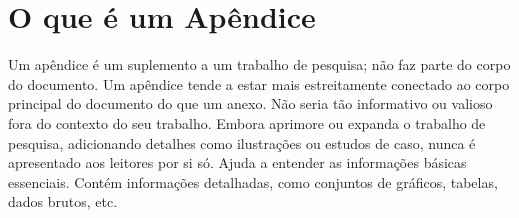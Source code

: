 \chapter{O que é um Apêndice}
Um apêndice é um suplemento a um trabalho de pesquisa; não faz parte do corpo do documento. Um apêndice tende a estar mais estreitamente conectado ao corpo principal do documento do que um anexo. Não seria tão informativo ou valioso fora do contexto do seu trabalho. Embora aprimore ou expanda o trabalho de pesquisa, adicionando detalhes como ilustrações ou estudos de caso, nunca é apresentado aos leitores por si só. Ajuda a entender as informações básicas essenciais. Contém informações detalhadas, como conjuntos de gráficos, tabelas, dados brutos, etc.
